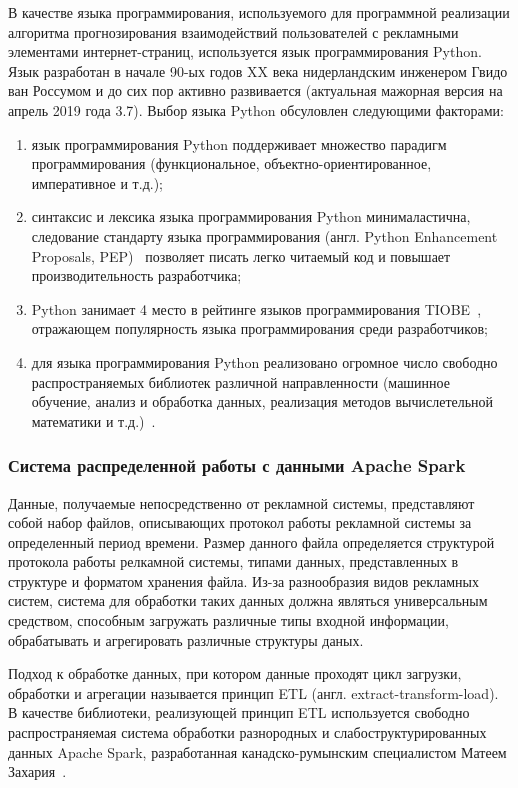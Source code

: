 В качестве языка программирования, используемого для программной реализации алгоритма прогнозирования взаимодействий пользователей
с рекламными элементами интернет-страниц, используется язык программирования Python. Язык разработан в начале 90-ых годов
XX века нидерландским инженером Гвидо ван Россумом и до сих пор активно развивается (актуальная мажорная версия на апрель 
2019 года 3.7). Выбор языка Python обсуловлен следующими факторами:
\begin{enumerate}
    \item язык программирования Python поддерживает множество парадигм программирования (функциональное, объектно-ориентированное,
    императивное и т.д.);
    \item синтаксис и лексика языка программирования Python минималастична, следование стандарту языка программирования 
    (англ. Python Enhancement Proposals, PEP)~\autocite{impl:pep} позволяет писать легко читаемый код и повышает 
    производительность разработчика;
    \item Python занимает 4 место в рейтинге языков программирования TIOBE~\autocite{impl:rating}, отражающем популярность 
    языка программирования среди разработчиков;
    \item для языка программирования Python реализовано огромное число свободно распространяемых библиотек различной 
    направленности (машинное обучение, анализ и обработка данных, реализация методов вычислетельной математики и 
    т.д.)~\autocite{impl:awesome-python}.
\end{enumerate}

\subsubsection{Система распределенной работы с данными Apache Spark}

Данные, получаемые непосредственно от рекламной системы, представляют собой набор файлов, описывающих протокол работы
рекламной системы за определенный период времени. Размер данного файла определяется структурой протокола работы релкамной системы,
типами данных, представленных в структуре и форматом хранения файла. Из-за разнообразия видов рекламных систем, система для обработки
таких данных должна являться универсальным средством, способным  загружать различные типы входной информации, обрабатывать и агрегировать
 различные структуры даных.

Подход к обработке данных, при котором данные проходят цикл загрузки, обработки и агрегации называется принцип ETL 
(англ. extract-transform-load). В качестве библиотеки, реализующей принцип ETL используется свободно распространяемая
система обработки разнородных и слабоструктурированных данных Apache Spark, разработанная канадско-румынским специалистом
Матеем Захария~\autocite{impl:spark}.

